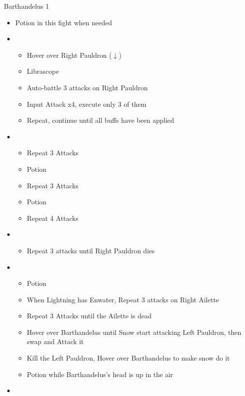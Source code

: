 \begin{battle}{Barthandelus 1}
\begin{multicols}{2}
\begin{itemize}
    \item Potion in this fight when needed
    \item \first
    \begin{itemize}
        \item Hover over Right Pauldron ($\downarrow$)
        \item Librascope
        \item Auto-battle 3 attacks on Right Pauldron
        \item Input Attack x4, execute only 3 of them
        \item Repeat, continue until all buffs have been applied
    \end{itemize}
    \item \sixth
    \begin{itemize}
        \item Repeat 3 Attacks
        \item Potion
        \item Repeat 3 Attacks
        \item Potion
        \item Repeat 4 Attacks
    \end{itemize}
    \item \fifth
    \begin{itemize}
        \item Repeat 3 attacks until Right Pauldron dies
    \end{itemize}
    \item \first
    \begin{itemize}
        \item Potion
        \item When Lightning has Enwater, Repeat 3 attacks on Right Ailette
        \item Repeat 3 Attacks until the Ailette is dead
        \item Hover over Barthandelus until Snow start attacking Left Pauldron, then swap and Attack it
        \item Kill the Left Pauldron, Hover over Barthandelus to make snow do it
        \item Potion while Barthandelus's head is up in the air
    \end{itemize}
    \columnbreak
    \item \second
    \begin{itemize}

\end{itemize}
\end{itemize}
\end{multicols}
\end{battle}
